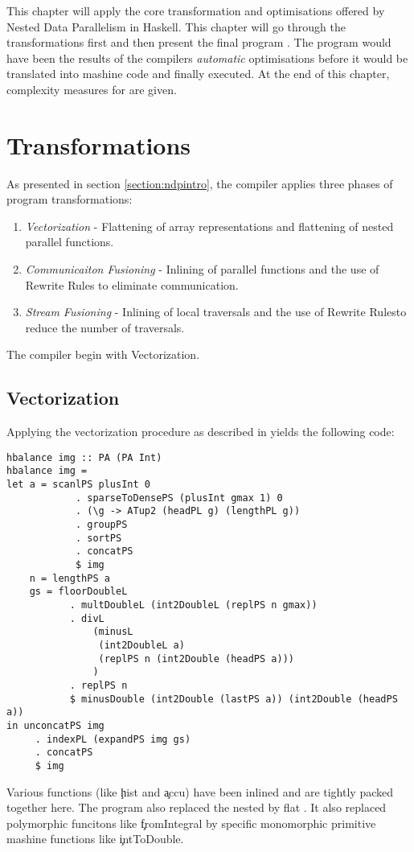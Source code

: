\label{chapter:ndpv}

This chapter will apply the core transformation and optimisations
offered by Nested Data Parallelism in Haskell.
This chapter will go through the transformations first and then present the
final program \ndpv. The program would have been the results of the compilers \textit{automatic}
optimisations before it would be translated into mashine code and finally executed.
At the end of this chapter, complexity measures for \ndpv are given.

\section{Transformations}
  As presented in section \ref{section:ndpintro}, the compiler applies
  three phases of program transformations:
  \begin{enumerate}
    \item \emph{Vectorization} - Flattening of array representations
      and flattening of nested parallel functions.
    \item \emph{Communicaiton Fusioning} - Inlining of parallel
      functions and the use of Rewrite Rules
      to eliminate communication.
    \item \emph{Stream Fusioning} - Inlining of local traversals and
      the use of Rewrite Rulesto reduce the number of traversals.
  \end{enumerate}
  
  The compiler begin with Vectorization.
  
  \subsection{Vectorization}
    Applying the vectorization procedure as described in \cite{Harness2008} yields the following code:
    \begin{lstlisting}
hbalance img :: PA (PA Int)
hbalance img = 
let a = scanlPS plusInt 0
            . sparseToDensePS (plusInt gmax 1) 0
            . (\g -> ATup2 (headPL g) (lengthPL g))
            . groupPS
            . sortPS
            . concatPS
            $ img
    n = lengthPS a
    gs = floorDoubleL
           . multDoubleL (int2DoubleL (replPS n gmax))
           . divL
               (minusL
                (int2DoubleL a)
                (replPS n (int2Double (headPS a)))
               )
           . replPS n
           $ minusDouble (int2Double (lastPS a)) (int2Double (headPS a))
in unconcatPS img
     . indexPL (expandPS img gs)
     . concatPS
     $ img
    \end{lstlisting} %
    Various functions (like \c{hist} and \c{accu}) have been inlined and are tightly packed together here.
    The program also replaced the nested \pan by flat \pav.
    It also replaced polymorphic funcitons like \c{fromIntegral}
    by specific monomorphic primitive mashine functions like \c{intToDouble}.
    
